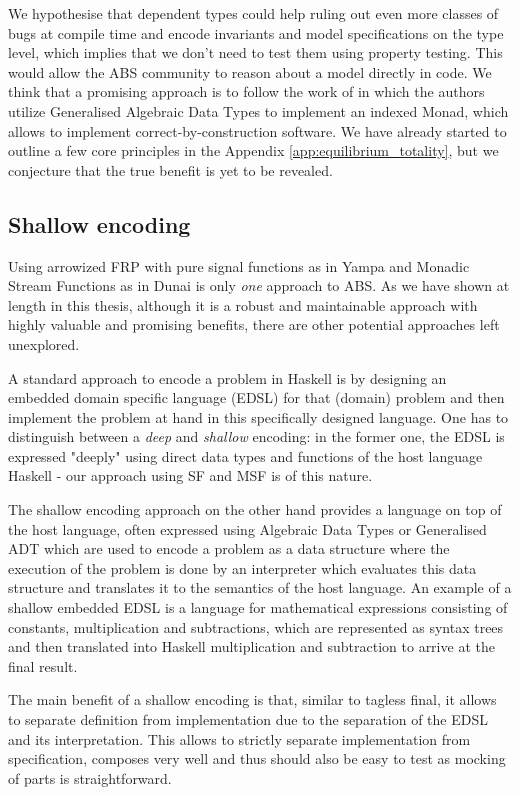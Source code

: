 We hypothesise that dependent types could help ruling out even more classes of bugs at compile time and encode invariants and model specifications on the type level, which implies that we don't need to test them using property testing. This would allow the ABS community to reason about a model directly in code. We think that a promising approach is to follow the work of \cite{brady_programming_2013, brady_state_2016, fowler_dependent_2014} in which the authors utilize Generalised Algebraic Data Types to implement an indexed Monad, which allows to implement correct-by-construction software. We have already started to outline a few core principles in the Appendix \ref{app:equilibrium_totality}, but we conjecture that the true benefit is yet to be revealed.

\subsection{Shallow encoding}
Using arrowized FRP with pure signal functions as in Yampa and Monadic Stream Functions as in Dunai is only \textit{one} approach to ABS. As we have shown at length in this thesis, although it is a robust and maintainable approach with highly valuable and promising benefits, there are other potential approaches left unexplored.

A standard approach to encode a problem in Haskell is by designing an embedded domain specific language (EDSL) for that (domain) problem and then implement the problem at hand in this specifically designed language. One has to distinguish between a \textit{deep} and \textit{shallow} encoding: in the former one, the EDSL is expressed "deeply" using direct data types and functions of the host language Haskell - our approach using SF and MSF is of this nature.

The shallow encoding approach on the other hand provides a language on top of the host language, often expressed using Algebraic Data Types or Generalised ADT which are used to encode a problem as a data structure where the execution of the problem is done by an interpreter which evaluates this data structure and translates it to the semantics of the host language. An example of a shallow embedded EDSL is a language for mathematical expressions consisting of constants, multiplication and subtractions, which are represented as syntax trees and then translated into Haskell multiplication and subtraction to arrive at the final result.

The main benefit of a shallow encoding is that, similar to tagless final, it allows to separate definition from implementation due to the separation of the EDSL and its interpretation. This allows to strictly separate implementation from specification, composes very well and thus should also be easy to test as mocking of parts is straightforward.

